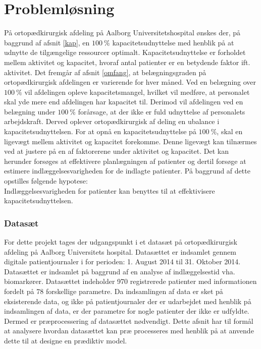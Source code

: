 \chapter{Problemløsning}
På ortopædkirurgisk afdeling på Aalborg Universitetshospital ønskes der, på baggrund af afsnit \ref{kap}, en $100~\%$ kapacitetsudnyttelse med henblik på at udnytte de tilgængelige ressourcer optimalt. Kapacitetsudnyttelse er forholdet mellem aktivitet og kapacitet, hvoraf antal patienter er en betydende faktor ift. aktivitet. 
Det fremgår af afsnit \ref{omfang}, at belægningsgraden på ortopædkirurgisk afdelingen er varierende for hver måned. Ved en belægning over $100~\%$ vil afdelingen opleve kapacitetsmangel, hvilket vil medføre, at personalet skal yde mere end afdelingen har kapacitet til. Derimod vil afdelingen ved en belægning under $100~\%$ forårsage, at der ikke er fuld udnyttelse af personalets arbejdskraft. Derved oplever ortopædkirurgisk af deling en ubalance i kapacitetsudnyttelsen. 
For at opnå en kapacitetsudnyttelse på $100~\%$, skal en ligevægt mellem aktivitet og kapacitet forekomme. Denne ligevægt kan tilnærmes ved at justere på en af faktorerene under aktivitet og kapacitet\cite{Bames2015}. Det kan herunder forsøges at effektivere planlægningen af patienter og dertil forsøge at estimere indlæggelsesvarigheden for de indlagte patienter. 
På baggrund af dette opstilles følgende hypotese:\\

\noindent
Indlæggelsesvarigheden for patienter kan benyttes til at effektivisere kapacitetsudnyttelsen. 

\subsection{Datasæt}
For dette projekt tages der udgangspunkt i et datasæt på ortopædkirurgisk afdeling på Aalborg Universitets hospital. Datasættet er indsamlet gennem digitale patientjournaler i for perioden: 1. August 2014 til 31. Oktober 2014. Datasættet er indsamlet på baggrund af en analyse af indlæggelsestid vha. biomarkører. Datasættet indeholder 970 registrerede patienter med informationen fordelt på 78 forskellige parametre. Da indsamlingen af data er sket på eksisterende data, og ikke på patientjournaler der er udarbejdet med henblik på indsamlingen af data, er der parametre for nogle patienter der ikke er udfyldte. Dermed er præprocessering af datasættet nødvendigt. Dette afsnit har til formål at analysere hvordan datasættet kan præ processeres med henblik på at anvende dette til at designe en prædiktiv model.

